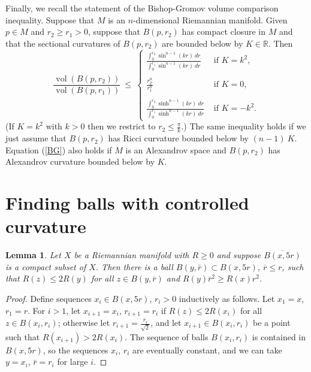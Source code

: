 \documentclass[12pt]{amsart}
\newcommand{\R}{{\mathbb R}}
\newcommand{\vol}{\operatorname{vol}}
\newcommand{\ol}{\overline}
\numberwithin{equation}{section}
\theoremstyle{plain}
\newtheorem{lemma}[equation]{Lemma}
\theoremstyle{definition}
\theoremstyle{remark}
\begin{document}
Finally, we recall the statement of the Bishop-Gromov volume
comparison inequality.  Suppose that $M$ is an
$n$-dimensional
Riemannian manifold.
Given $p \in M$ and $r_2 \ge r_1 > 0$,
suppose that $B(p, r_2)$ has compact closure in $M$ and that the
sectional curvatures of $B(p, r_2)$ are bounded below by
$K \in \R$. Then
\begin{equation} \label{BG}
\frac{\vol(B(p, r_2))}{\vol(B(p, r_1))} \: \le \:
\begin{cases}
\frac{\int_0^{r_2} \sin^{n-1}(kr) \: dr}{\int_0^{r_1} \sin^{n-1}(kr) \: dr} 
& \text{ if } K = k^2, \\ \\
\frac{r_2^n}{r_1^n} 
& \text{ if } K = 0, \\ \\
\frac{\int_0^{r_2} \sinh^{n-1}(kr) \: dr}{\int_0^{r_1} \sinh^{n-1}(kr) \: dr} 
& \text{ if } K =  -  k^2.
\end{cases}
\end{equation}
(If $K = k^2$ with $k>0$ then we restrict to $r_2 \le \frac{\pi}{k}$.)
The same inequality holds if we just assume that
$B(p, r_2)$ has Ricci curvature bounded below by
$(n-1) \: K$. Equation (\ref{BG}) also holds if
$M$ is an Alexandrov space and $B(p, r_2)$ has Alexandrov curvature
bounded below by $K$.

\section{Finding balls with controlled curvature} \label{pointpicking}

\begin{lemma}
\label{selection}
Let $X$ be a Riemannian manifold
with $R \ge 0$
and suppose $\ol{B(x,5r)}$
is a compact subset of $X$.  Then there is a ball 
$B(y,\bar r)\subset B(x,5r)$, $\overline{r} \le r$,
such that $R(z)\leq 2R(y)$
for all $z\in B(y,\bar r)$ and $R(y)\bar r^2\geq R(x)r^2$.
\end{lemma}
\begin{proof}
Define sequences $x_i\in B(x,5r)$, $r_i>0$
inductively as follows.  Let $x_1=x$, $r_1=r$.
For $i>1$, let $x_{i+1}=x_i$, $r_{i+1}=r_i$ if
$R(z)\leq 2R(x_i)$ for all $z\in B(x_i,r_i)$;
otherwise let $r_{i+1}=\frac{r_i}{\sqrt{2}}$, and let 
$x_{i+1}\in B(x_i,r_i)$ be a point such that
$R(x_{i+1})>2R(x_i)$.  The sequence of balls
$B(x_i,r_i)$ is contained in $B(x,5r)$, so the
sequences $x_i,\,r_i$ are eventually constant,
and we can take $y=x_i$, $\bar r=r_i$ for large
$i$.
\end{proof}
\end{document}
